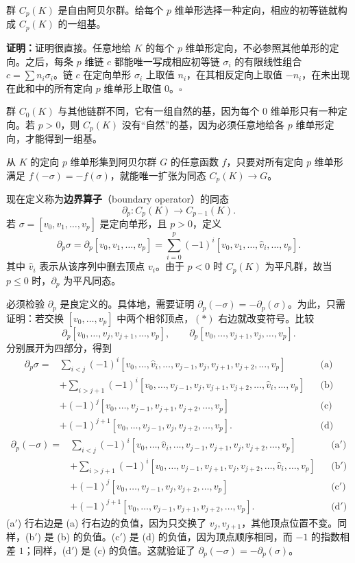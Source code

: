 群 $C_p(K)$ 是自由阿贝尔群。给每个 $p$ 维单形选择一种定向，相应的初等链就构成 $C_p(K)$ 的一组基。

\noindent\textbf{证明：}证明很直接。任意地给 $K$ 的每个 $p$ 维单形定向，不必参照其他单形的定向。之后，每条 $p$ 维链 $c$ 都能唯一写成相应初等链 $\sigma_i$ 的有限线性组合 $c=\sum n_i\sigma_i$。链 $c$ 在定向单形 $\sigma_i$ 上取值 $n_i$，在其相反定向上取值 $-n_i$，在未出现在此和中的所有定向 $p$ 维单形上取值 $0$。\hfill$\square$

群 $C_0(K)$ 与其他链群不同，它有一组自然的基，因为每个 $0$ 维单形只有一种定向。若 $p>0$，则 $C_p(K)$ 没有“自然”的基，因为必须任意地给各 $p$ 维单形定向，才能得到一组基。

从 $K$ 的定向 $p$ 维单形集到阿贝尔群 $G$ 的任意函数 $f$，只要对所有定向 $p$ 维单形满足 $f(-\sigma)=-f(\sigma)$，就能唯一扩张为同态 $C_p(K)\to G$。

现在定义称为\textbf{边界算子}（boundary operator）的同态
\[
\partial_p:C_p(K)\longrightarrow C_{p-1}(K).
\]
若 $\sigma=[v_0,v_1,\ldots,v_p]$ 是定向单形，且 $p>0$，定义
\[
\partial_p\sigma=\partial_p[v_0,v_1,\ldots,v_p]
=\sum_{i=0}^p(-1)^i[v_0,v_1,\ldots,\widehat v_i,\ldots,v_p].\tag{$*$}
\]
其中 $\widehat v_i$ 表示从该序列中删去顶点 $v_i$。由于 $p<0$ 时 $C_p(K)$ 为平凡群，故当 $p\leq0$ 时，$\partial_p$ 为平凡同态。

必须检验 $\partial_p$ 是良定义的。具体地，需要证明 $\partial_p(-\sigma)=-\partial_p(\sigma)$。为此，只需证明：若交换 $[v_0,\ldots,v_p]$ 中两个相邻顶点，$(*)$ 右边就改变符号。比较
\[
\partial_p[v_0,\ldots,v_j,v_{j+1},\ldots,v_p],\qquad
\partial_p[v_0,\ldots,v_{j+1},v_j,\ldots,v_p].
\]
分别展开为四部分，得到
\begin{align*}
\partial_p\sigma={}&\sum_{i<j}(-1)^i[v_0,\ldots,\widehat v_i,\ldots,v_{j-1},v_j,v_{j+1},v_{j+2},\ldots,v_p] &&\text{(a)}\\
&+\sum_{i>j+1}(-1)^i[v_0,\ldots,v_{j-1},v_j,v_{j+1},v_{j+2},\ldots,\widehat v_i,\ldots,v_p] &&\text{(b)}\\
&+(-1)^j[v_0,\ldots,v_{j-1},v_{j+1},v_{j+2},\ldots,v_p] &&\text{(c)}\\
&+(-1)^{j+1}[v_0,\ldots,v_{j-1},v_j,v_{j+2},\ldots,v_p]. &&\text{(d)}
\end{align*}
\begin{align*}
\partial_p(-\sigma)={}&\sum_{i<j}(-1)^i[v_0,\ldots,\widehat v_i,\ldots,v_{j-1},v_{j+1},v_j,v_{j+2},\ldots,v_p] &&\text{(a$'$)}\\
&+\sum_{i>j+1}(-1)^i[v_0,\ldots,v_{j-1},v_{j+1},v_j,v_{j+2},\ldots,\widehat v_i,\ldots,v_p] &&\text{(b$'$)}\\
&+(-1)^j[v_0,\ldots,v_{j-1},v_j,v_{j+2},\ldots,v_p] &&\text{(c$'$)}\\
&+(-1)^{j+1}[v_0,\ldots,v_{j-1},v_{j+1},v_{j+2},\ldots,v_p]. &&\text{(d$'$)}
\end{align*}
(a$'$) 行右边是 (a) 行右边的负值，因为只交换了 $v_j,v_{j+1}$，其他顶点位置不变。同样，(b$'$) 是 (b) 的负值。(c$'$) 是 (d) 的负值，因为顶点顺序相同，而 $-1$ 的指数相差 $1$；同样，(d$'$) 是 (c) 的负值。这就验证了 $\partial_p(-\sigma)=-\partial_p(\sigma)$。

